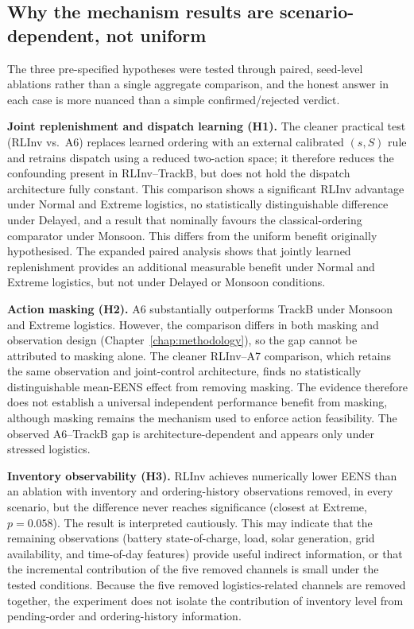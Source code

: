 \subsection{Why the mechanism results are scenario-dependent, not uniform}

The three pre-specified hypotheses were tested through paired,
seed-level ablations rather than a single aggregate comparison, and the
honest answer in each case is more nuanced than a simple confirmed/rejected
verdict.

\textbf{Joint replenishment and dispatch learning (H1).} The cleaner
practical test (RLInv vs.\ A6) replaces learned ordering with an
external calibrated $(s,S)$ rule and retrains dispatch using a reduced
two-action space; it therefore reduces the confounding present in
RLInv--TrackB, but does not hold the dispatch architecture fully
constant. This comparison shows a
significant RLInv advantage under Normal and Extreme logistics, no
statistically distinguishable difference under Delayed, and a result that nominally favours the
classical-ordering comparator under Monsoon. This differs from the
uniform benefit originally hypothesised. The expanded paired analysis
shows that jointly learned replenishment provides an additional
measurable benefit under Normal and Extreme logistics, but not under
Delayed or Monsoon conditions.

\textbf{Action masking (H2).} A6 substantially outperforms TrackB
under Monsoon and Extreme logistics. However, the comparison differs
in both masking and observation design (Chapter~\ref{chap:methodology}), so the gap cannot be
attributed to masking alone. The cleaner RLInv--A7 comparison, which
retains the same observation and joint-control architecture, finds no
statistically distinguishable mean-EENS effect from removing masking.
The evidence therefore does not establish a universal independent
performance benefit from masking, although masking remains the
mechanism used to enforce action feasibility. The observed A6--TrackB
gap is architecture-dependent and appears only under stressed
logistics.

\textbf{Inventory observability (H3).} RLInv achieves numerically lower
EENS than an ablation with inventory and ordering-history observations
removed, in every scenario, but the difference never reaches
significance (closest at Extreme, $p=0.058$). The result is interpreted
cautiously. This may indicate that the remaining observations (battery
state-of-charge, load, solar generation, grid availability, and
time-of-day features) provide useful indirect information, or that the
incremental contribution of the five removed channels is small under
the tested conditions. Because the five removed logistics-related
channels are removed together, the experiment does not isolate the
contribution of inventory level from pending-order and
ordering-history information.

